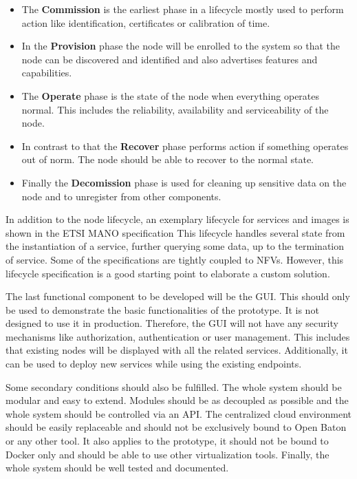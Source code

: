 \begin{itemize}
  \item The \textbf{Commission} is the earliest phase in a lifecycle mostly used to perform action like identification, certificates or calibration of time.\autocite[cf.][p. 52 f.]{OpenFog:2017}
  \item In the \textbf{Provision} phase the node will be enrolled to the system so that the node can be discovered and identified and also advertises features and capabilities.\autocite[cf.][p. 52 f.]{OpenFog:2017}
  \item The \textbf{Operate} phase is the state of the node when everything operates normal.
  This includes the reliability, availability and serviceability of the node.\autocite[cf.][p. 53]{OpenFog:2017}
  \item In contrast to that the \textbf{Recover} phase performs action if something operates out of norm.\autocite[cf.][p. 53]{OpenFog:2017}
  The node should be able to recover to the normal state.\autocite[cf.][p. 53]{OpenFog:2017}
  \item Finally the \textbf{Decomission} phase is used for cleaning up sensitive data on the node and to unregister from other components.\autocite[cf.][p. 53]{OpenFog:2017}
\end{itemize}

In addition to the node lifecycle, an exemplary lifecycle for services and images is shown in the \ac{ETSI} \ac{MANO} specification\autocite[cf.][p. 67 ff.]{ETSI:MANO:2014}
This lifecycle handles several state from the instantiation of a service, further querying some data, up to the termination of service.
Some of the specifications are tightly coupled to \acp{NFV}.
However, this lifecycle specification is a good starting point to elaborate a custom solution.

The last functional component to be developed will be the \ac{GUI}.
This should only be used to demonstrate the basic functionalities of the prototype.
It is not designed to use it in production.
Therefore, the \ac{GUI} will not have any security mechanisms like authorization, authentication or user management.
This includes that existing nodes will be displayed with all the related services.
Additionally, it can be used to deploy new services while using the existing endpoints.

Some secondary conditions should also be fulfilled.
The whole system should be modular and easy to extend.
Modules should be as decoupled as possible and the whole system should be controlled via an \ac{API}.
The centralized cloud environment should be easily replaceable and should not be exclusively bound to Open Baton or any other tool.
It also applies to the prototype, it should not be bound to Docker only and should be able to use other virtualization tools.
Finally, the whole system should be well tested and documented.


